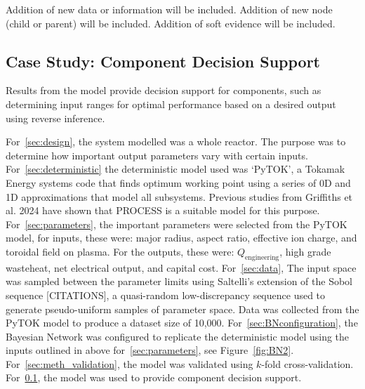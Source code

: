 \documentclass[journal]{IEEEtran}
\begin{document}
Addition of new data or information will be included. Addition of new node (child or parent) will be included. Addition of soft evidence will be included.

\subsection{Case Study: Component Decision Support}\label{sec:res_decision} 
Results from the model provide decision support for components, such as determining input ranges for optimal performance based on a desired output using reverse inference.

For~\ref{sec:design}, the system modelled was a whole reactor. The purpose was to determine how important output parameters vary with certain inputs. For~\ref{sec:deterministic} the deterministic  model used was `PyTOK', a Tokamak Energy systems code that finds optimum working point using a series of 0D and 1D approximations that model all subsystems. Previous studies from Griffiths et al. 2024 have shown that PROCESS is a suitable model for this purpose. For~\ref{sec:parameters}, the important parameters were selected from the PyTOK model, for inputs, these were: major radius, aspect ratio, effective ion charge, and toroidal field on plasma. For the outputs, these were: $Q_{\text{engineering}}$, high grade wasteheat, net electrical output, and capital cost. For~\ref{sec:data}, The input space was sampled between the parameter limits using Saltelli's extension of the Sobol sequence [CITATIONS], a quasi-random low-discrepancy sequence used to generate pseudo-uniform samples of parameter space. Data was collected from the PyTOK model to produce a dataset size of 10,000. For~\ref{sec:BNconfiguration}, the Bayesian Network was configured to replicate the deterministic model using the inputs outlined in above for~\ref{sec:parameters}, see Figure~\ref{fig:BN2}. For~\ref{sec:meth_validation}, the model was validated using $k$-fold cross-validation. For~\ref{sec:res_decision}, the model was used to provide component decision support.
\end{document}
